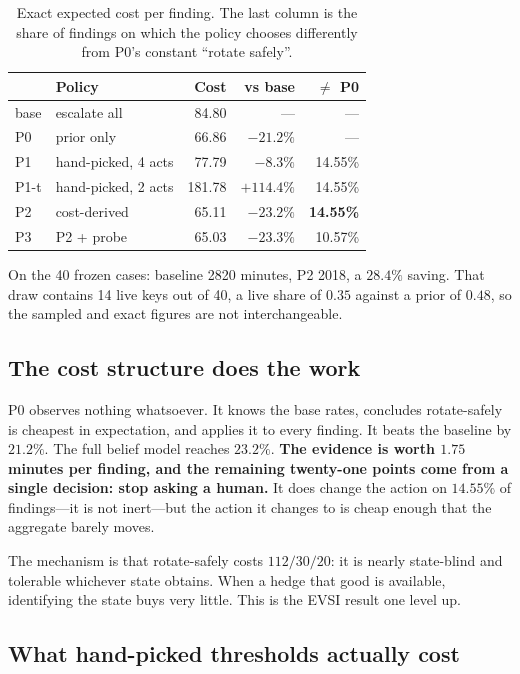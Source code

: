 \documentclass{article}
\begin{document}
\begin{table}[t]
\centering
\small
\begin{tabular}{llrrr}
\toprule
& \textbf{Policy} & \textbf{Cost} & \textbf{vs base} & \textbf{$\neq$ P0} \\
\midrule
base & escalate all & 84.80 & --- & --- \\
P0 & prior only & 66.86 & $-21.2\%$ & --- \\
P1 & hand-picked, 4 acts & 77.79 & $-8.3\%$ & 14.55\% \\
P1-t & hand-picked, 2 acts & 181.78 & $\mathbf{+114.4\%}$ & 14.55\% \\
P2 & cost-derived & 65.11 & $\mathbf{-23.2\%}$ & \textbf{14.55\%} \\
P3 & P2 + probe & 65.03 & $-23.3\%$ & 10.57\% \\
\bottomrule
\end{tabular}
\caption{Exact expected cost per finding. The last column is the share of
findings on which the policy chooses differently from P0's constant
``rotate safely''.}
\label{tab:main}
\end{table}

On the 40 frozen cases: baseline 2820 minutes, P2 2018, a $28.4\%$ saving. That
draw contains 14 live keys out of 40, a live share of $0.35$ against a prior of
$0.48$, so the sampled and exact figures are not interchangeable.

\subsection{The cost structure does the work}

P0 observes nothing whatsoever. It knows the base rates, concludes rotate-safely
is cheapest in expectation, and applies it to every finding. It beats the
baseline by $21.2\%$. The full belief model reaches $23.2\%$. \textbf{The
evidence is worth $1.75$ minutes per finding, and the remaining twenty-one
points come from a single decision: stop asking a human.} It does change the
action on $14.55\%$ of findings---it is not inert---but the action it changes to
is cheap enough that the aggregate barely moves.

The mechanism is that rotate-safely costs $112/30/20$: it is nearly state-blind
and tolerable whichever state obtains. When a hedge that good is available,
identifying the state buys very little. This is the EVSI result one level up.

\subsection{What hand-picked thresholds actually cost}
\end{document}
